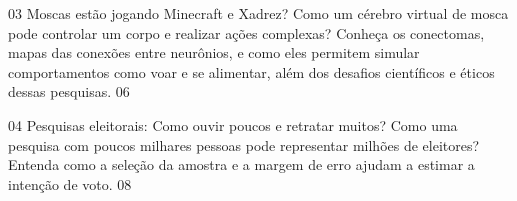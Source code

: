 \summaryitem
{03}
{Moscas estão jogando Minecraft e Xadrez?}
{Como um cérebro virtual de mosca pode controlar um corpo e realizar ações complexas? Conheça os conectomas, mapas das conexões entre neurônios, e como eles permitem simular comportamentos como voar e se alimentar, além dos desafios científicos e éticos dessas pesquisas.}
{06}

\summaryitem
{04}
{Pesquisas eleitorais: Como ouvir poucos e retratar muitos?}
{Como uma pesquisa com poucos milhares pessoas pode representar milhões de eleitores? Entenda como a seleção da amostra e a margem de erro ajudam a estimar a intenção de voto.}
{08}

\pagebreak

\vspace{0.3cm}